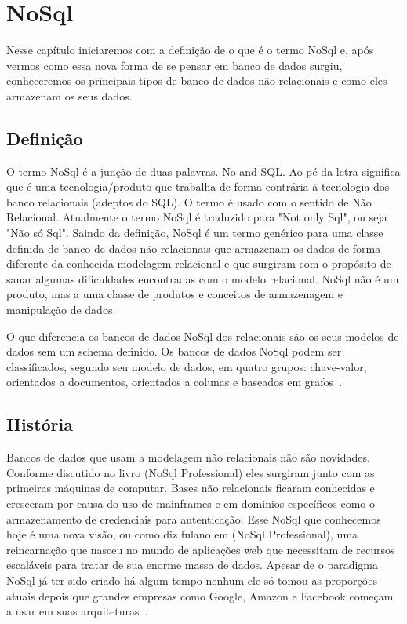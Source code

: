 \chapter{NoSql}

Nesse capítulo iniciaremos com a definição de o que é o termo NoSql e, após vermos como essa nova forma de se pensar em banco de dados surgiu, conheceremos os principais tipos de banco de dados não relacionais e como eles armazenam os seus dados. 


\section{Definição}

O termo NoSql é a junção de duas palavras. No and SQL. Ao pé da letra significa que é uma tecnologia/produto que trabalha de forma contrária à tecnologia dos banco relacionais (adeptos do SQL). O termo é usado com o sentido de Não Relacional. Atualmente o termo NoSql é traduzido para "Not only Sql", ou seja "Não só Sql".
Saindo da definição, NoSql é um termo genérico para uma classe definida de banco de dados não-relacionais que armazenam os dados  de forma diferente da conhecida modelagem relacional e que surgiram com o propósito de sanar algumas dificuldades encontradas com o modelo relacional. NoSql não é um produto, mas a uma classe de produtos e conceitos de armazenagem e manipulação de dados. 

O que diferencia os bancos de dados NoSql dos relacionais são os seus modelos de dados sem um schema definido. Os bancos de dados NoSql podem ser classificados, segundo seu modelo de dados, em quatro grupos: chave-valor, orientados a documentos, orientados a colunas e baseados em grafos~\cite{nosqlxrelacional,nosqlevaluation}.

\section{História}

Bancos de dados que usam a modelagem não relacionais não são novidades. Conforme discutido no livro (NoSql Professional) eles surgiram junto com as primeiras máquinas de computar. Bases não relacionais ficaram conhecidas e cresceram por causa do uso de mainframes e em dominios específicos como o armazenamento de credenciais para autenticação. Esse NoSql que conhecemos hoje é uma nova visão, ou como diz fulano em (NoSql Professional), uma reincarnação que nasceu no mundo de aplicações web que necessitam de recursos escaláveis para tratar de sua enorme massa de dados. Apesar de o paradigma NoSql já ter sido criado há algum tempo nenhum ele só tomou as proporções atuais depois que grandes empresas como Google, Amazon e Facebook começam a usar em suas arquiteturas~\cite{nosqlevaluation}.

